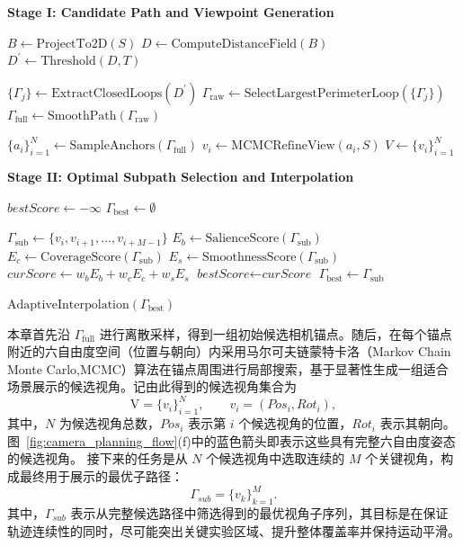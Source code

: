 \begin{algorithm}[!t]
\caption{面向场景展示的相机规划算法}
\label{algo:camera_planning}
\begin{algorithmic}[1]

\STATE \textbf{Stage I: Candidate Path and Viewpoint Generation}

\STATE $B \gets \text{ProjectTo2D}(S)$
\STATE $D \gets \text{ComputeDistanceField}(B)$
\STATE $D^{\prime} \gets \text{Threshold}(D, T)$

\STATE $\{\Gamma_j\} \gets \text{ExtractClosedLoops}(D^{\prime})$
\STATE $\Gamma_{\text{raw}} \gets \text{SelectLargestPerimeterLoop}(\{\Gamma_j\})$
\STATE $\Gamma_{\text{full}} \gets \text{SmoothPath}(\Gamma_{\text{raw}})$

\STATE $\{a_i\}_{i=1}^{N} \gets \text{SampleAnchors}(\Gamma_{\text{full}})$
    \STATE $v_i \gets \text{MCMCRefineView}(a_i, S)$
\ENDFOR
\STATE $V \gets \{v_i\}_{i=1}^{N}$


\STATE

\STATE \textbf{Stage II: Optimal Subpath Selection and Interpolation}


\STATE $\textit{bestScore} \gets -\infty$
\STATE $\Gamma_{\text{best}} \gets \emptyset$



    \STATE $\Gamma_{\text{sub}} \gets \{v_i, v_{i+1}, \dots, v_{i+M-1}\}$
    \STATE $E_b \gets \text{SalienceScore}(\Gamma_{\text{sub}})$
    \STATE $E_c \gets \text{CoverageScore}(\Gamma_{\text{sub}})$
    \STATE $E_s \gets \text{SmoothnessScore}(\Gamma_{\text{sub}})$
    \STATE $\textit{curScore} \gets w_b E_b + w_c E_c + w_s E_s$
        \STATE $\textit{bestScore} \gets \textit{curScore}$
        \STATE $\Gamma_{\text{best}} \gets \Gamma_{\text{sub}}$
    \ENDIF
\ENDFOR

\STATE $\text{AdaptiveInterpolation}(\Gamma_{\text{best}})$

\end{algorithmic}
\end{algorithm}


本章首先沿 $\Gamma_{\text{full}}$ 进行离散采样，得到一组初始候选相机锚点。随后，在每个锚点附近的六自由度空间（位置与朝向）内采用马尔可夫链蒙特卡洛（Markov Chain Monte Carlo\cite{hastings1970monte},MCMC）算法在锚点周围进行局部搜索，基于显著性生成一组适合场景展示的候选视角。记由此得到的候选视角集合为
\begin{equation}
\text{V}=\{v_i\}_{i=1}^{N}, \qquad v_i=(Pos_i,Rot_i),
\end{equation}
其中，$N$ 为候选视角总数，$Pos_i$ 表示第 $i$ 个候选视角的位置，$Rot_i$ 表示其朝向。图~\ref{fig:camera_planning_flow}(f)中的蓝色箭头即表示这些具有完整六自由度姿态的候选视角。
接下来的任务是从 $N$ 个候选视角中选取连续的 $M$ 个关键视角，构成最终用于展示的最优子路径：
\begin{equation}
\Gamma_{sub}=\{v_{k}\}_{k=1}^{M}.
\end{equation}
其中，$\Gamma_{sub}$ 表示从完整候选路径中筛选得到的最优视角子序列，其目标是在保证轨迹连续性的同时，尽可能突出关键实验区域、提升整体覆盖率并保持运动平滑。


